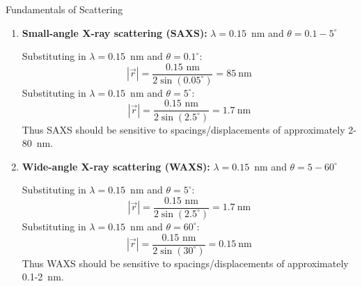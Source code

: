 \begin{activity}{Fundamentals of Scattering}
\begin{ctqs}
\begin{enumerate}
			\begin{solution}[2.75in]{}
				To make this problem easier, note that
				\begin{align*}
					|\vec r| &= \frac{2\pi}{|\vec q|} = \frac{2\pi}{2\left(\frac{2\pi}{\lambda}\right)\sin\left(\frac{\theta}{2}\right)} 
				= \frac{\lambda}{2\sin\left(\frac{\theta}{2}\right)}
				\end{align*}
				Substituting in $\lambda = 633$~nm and $\theta=30^\circ$:
				\begin{equation*}
					|\vec r| = \frac{633\text{ nm}}{2\sin(15^\circ)} = 1200\text{ nm} = 1.2~\mu\text{m}
				\end{equation*}
				Substituting in $\lambda = 633$~nm and $\theta=150^\circ$:
				\begin{equation*}
					|\vec r| = \frac{633\text{ nm}}{2\sin(75^\circ)} = 330\text{ nm}
				\end{equation*}
				Thus light scattering should be sensitive to spacings/displacements of approximately 300-1200~nm.
			\end{solution}
		
		\item \textbf{Small-angle X-ray scattering (SAXS):} $\lambda = 0.15$~nm and $\theta = 0.1-5^\circ$
		
			\begin{solution}[2.75in]{}
				Substituting in $\lambda = 0.15$~nm and $\theta=0.1^\circ$:
				\begin{equation*}
					|\vec r| = \frac{0.15\text{ nm}}{2\sin(0.05^\circ)} = 85~\text{nm}
				\end{equation*}
				Substituting in $\lambda = 0.15$~nm and $\theta=5^\circ$:
				\begin{equation*}
					|\vec r| = \frac{0.15\text{ nm}}{2\sin(2.5^\circ)} = 1.7~\text{nm}
				\end{equation*}
				Thus SAXS should be sensitive to spacings/displacements of approximately 2-80~nm.
			\end{solution}
		
		\item \textbf{Wide-angle X-ray scattering (WAXS):} $\lambda = 0.15$~nm and $\theta = 5-60^\circ$
		
			\begin{solution}[2.5in]{}
				Substituting in $\lambda = 0.15$~nm and $\theta=5^\circ$:
				\begin{equation*}
					|\vec r| = \frac{0.15\text{ nm}}{2\sin(2.5^\circ)} = 1.7~\text{nm}
				\end{equation*}
				Substituting in $\lambda = 0.15$~nm and $\theta=60^\circ$:
				\begin{equation*}
					|\vec r| = \frac{0.15\text{ nm}}{2\sin(30^\circ)} = 0.15~\text{nm}
				\end{equation*}
				Thus WAXS should be sensitive to spacings/displacements of approximately 0.1-2~nm.
			\end{solution}
		

\end{enumerate}
\end{ctqs}
\end{activity}
